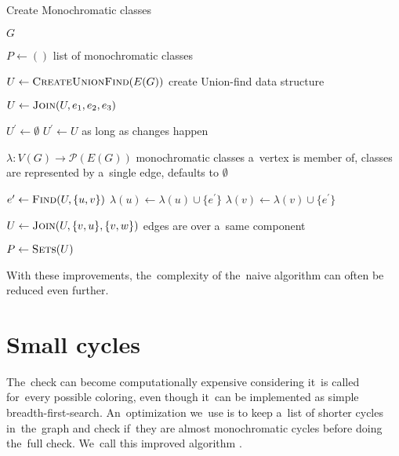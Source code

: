 \begin{algorithm}
	\caption[Create Monochromatic classes]{Create Monochromatic classes~\cite{my_paper}}%
	\label{alg:create_monochromatic_classes}
	\begin{algorithmic}[1]
		\Require{} $G$

		\Ensure{} $P \gets ()$
		\Comment{} list of monochromatic classes

		\State{} $U \gets \Call{CreateUnionFind}{E(G)}$
		\Comment{} create Union-find data structure

		\State{} $U \gets \Call{Join}{U, e_{1}, e_{2}, e_{3}}$
		\EndFor{}

		\State{} $U^\prime \gets \emptyset$
		\State{} $U^\prime \gets U$
		\Comment{} as long as changes happen

		\State{} $\lambda : V(G) \to \mathcal{P}(E(G))$
		\Comment{} monochromatic classes a~vertex is member of,
		\State{}
		\Comment{} classes are represented by a~single edge, defaults to $\emptyset$

		\State{} $e^\prime \gets \Call{Find}{U, \{u, v\}}$
		\State{} $\lambda(u) \gets \lambda(u) \cup \{e^\prime\}$
		\State{} $\lambda(v) \gets \lambda(v) \cup \{e^\prime\}$
		\EndFor{}

		\State{} $U \gets \Call{Join}{U, \{v, u\}, \{v, w\}}$
		\Comment{} edges are over a~same component
		\EndIf{}
		\EndFor{}
		\EndWhile{}

		\State{} $P \gets \Call{Sets}{U}$

	\end{algorithmic}
\end{algorithm}

With these improvements, the~complexity of the~naive algorithm can often be
reduced even further.

\section{Small cycles}%
\label{sec:small_cycles}

The~check \IsNACColoring{} can become computationally expensive
considering it~is called for~every possible coloring,
even though it~can be implemented as simple breadth-first-search.
An~optimization we~use is to keep a~list of shorter cycles in~the~graph and
check if~they are almost monochromatic cycles before doing the~full check.
We~call this improved \Naive{} algorithm \NaiveCycles{}.

